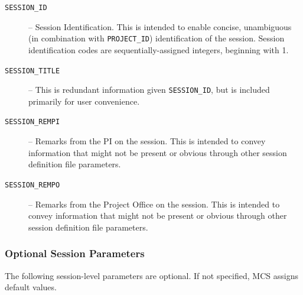 \begin{description}
\item[\texttt{SESSION\_ID}] -- Session Identification.  This is intended to enable concise, unambiguous (in combination with \texttt{PROJECT\_ID}) identification of the session.  Session identification codes are sequentially-assigned integers, beginning with 1.

\item[\texttt{SESSION\_TITLE}] -- This is redundant information given \texttt{SESSION\_ID}, but is included primarily for user convenience.

\item[\texttt{SESSION\_REMPI}] -- Remarks from the PI on the session.  This is intended to convey information that might not be present or obvious through other session definition file parameters.

\item[\texttt{SESSION\_REMPO}] -- Remarks from the Project Office on the session.  This is intended to convey information that might not be present or obvious through other session definition file parameters.
\end{description}

\subsubsection{Optional Session Parameters}

The following session-level parameters are optional.  If not specified, MCS assigns default values.

